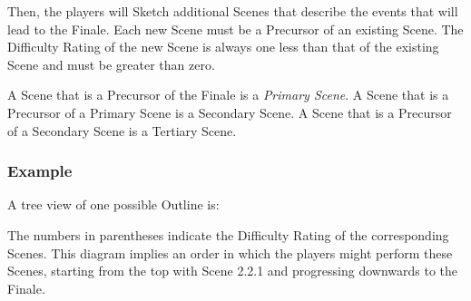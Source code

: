 \documentclass[12pt, a5paper, parskip=half-]{scrartcl}
\begin{document}
Then, the players will Sketch additional Scenes that describe the events that will lead to the Finale.
Each new Scene must be a Precursor of an existing Scene.
The Difficulty Rating of the new Scene is always one less than that of the existing Scene and must be greater than zero.

A Scene that is a Precursor of the Finale is a \emph{Primary Scene}.
A Scene that is a Precursor of a Primary Scene is a {Secondary Scene}.
A Scene that is a Precursor of a Secondary Scene is a {Tertiary Scene}.

%

\newpage
\subsubsection*{Example}
A tree view of one possible Outline is:
\smallskip
\begin{center}
\end{center}

The numbers in parentheses indicate the Difficulty Rating of the corresponding Scenes. This diagram implies an order in which the players might perform these Scenes, starting from the top with Scene 2.2.1 and progressing downwards to the Finale.
\end{document}
